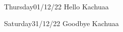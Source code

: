 
\begin{diary}{Thursday}{01/12/22}
    \mybox{\emoamazed}
Hello Kachuaa
\end{diary}


\begin{diary}{Saturday}{31/12/22}
    \mybox{\emoconfused}
Goodbye Kachuaa

\noindent{}
\end{diary}